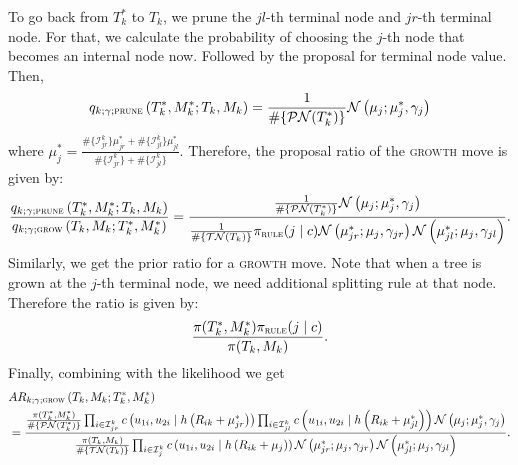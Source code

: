 \documentclass[
12pt]{article}
\begin{document}
To go back from $T^{\ast}_k$ to $T_k$, we prune the $jl$-th terminal node and $jr$-th terminal node. For that, we calculate the probability of choosing the $j$-th node that becomes an internal node now. Followed by the proposal for terminal node value. Then,
\begin{equation*}
	q_{k;\gamma;\textsc{prune}}\left(T_k^{\ast}, M_k^{\ast};T_k,M_k\right) 
	= \frac{1}{\#\{\mathcal{PN}(T_k^{\ast})\}} \mathcal{N}\left(\mu_j;\mu^{\ast}_j,\gamma_j\right)
\end{equation*} 
where $\mu^{\ast}_j = \frac{ \#\{\mathcal{I}^k_{jr}\}\mu_{jr}^{\ast} +  \#\{\mathcal{I}^k_{jl}\}\mu_{jl}^{\ast}}{ \#\{\mathcal{I}^k_{jr}\}+ \#\{\mathcal{I}^k_{jl}\}}$. Therefore, the proposal ratio of the \textsc{growth} move is given by:
\begin{equation*}
	\frac{q_{k;\gamma;\textsc{prune}}\left(T_k^{\ast}, M_k^{\ast};T_k,M_k\right)}{q_{k;\gamma;\textsc{grow}}\left(T_k,M_k;T_k^{\ast}, M_k^{\ast}\right) } 
	= \frac{\frac{1}{\#\{\mathcal{PN}(T_k^{\ast})\}} \mathcal{N}\left(\mu_j;\mu_{j}^{\ast},\gamma_j\right)}{\frac{1}{\#\{\mathcal{TN}(T_k)\}} \pi_{\textsc{rule}}(j\mid c)\mathcal{N}\left(\mu_{jr}^{\ast};\mu_{j},\gamma_{jr}\right)\mathcal{N}\left(\mu_{jl}^{\ast};\mu_{j},\gamma_{jl}\right)}.
\end{equation*}
Similarly, we get the prior ratio for a \textsc{growth} move. Note that when a tree is grown at the $j$-th terminal node, we need additional splitting rule at that node. Therefore the ratio is given by:
\begin{equation*}
	\frac{\pi(T_k^{\ast},M_k^{\ast})\pi_{\textsc{rule}}(j\mid c)}{\pi(T_k,M_k)}.
\end{equation*}
Finally, combining with the likelihood we get
\begin{align*}
	&AR_{k;\gamma;\textsc{grow}}\left(T_k,M_k;T_k^{\ast}, M_k^{\ast}\right)\\
	&= \frac{
		\frac{\pi(T_k^{\ast},M_k^{\ast})}{\#\{\mathcal{PN}(T_k^{\ast})\}} 
		\prod_{i\in \mathcal{I}_{jr}^k}c\left(u_{1i},u_{2i}\mid h\left(R_{ik}+\mu^{\ast}_{jr}\right)\right)
		\prod_{i\in \mathcal{I}_{jl}^k}c\left(u_{1i},u_{2i}\mid h\left(R_{ik}+\mu^{\ast}_{jl}\right)\right)
		\mathcal{N}\left(\mu_j;\mu_{j}^{\ast},\gamma_j\right)}
	{\frac{\pi(T_k,M_k)}{\#\{\mathcal{TN}(T_k)\}} 
		\prod_{i\in \mathcal{I}_{j}^k}c\left(u_{1i},u_{2i}\mid h\left(R_{ik}+\mu_j\right)\right) 
		\mathcal{N}\left(\mu_{jr}^{\ast};\mu_{j},\gamma_{jr}\right)\mathcal{N}\left(\mu_{jl}^{\ast};\mu_{j},\gamma_{jl}\right)}.
\end{align*}
\end{document}
